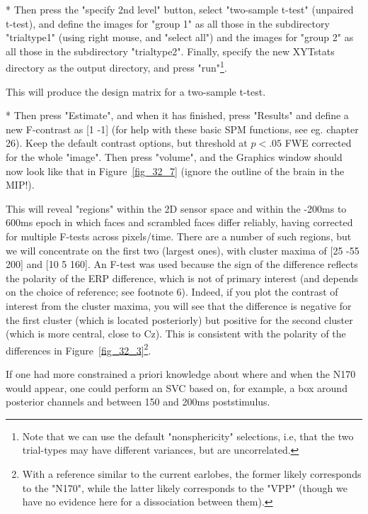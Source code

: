 * Then press the "specify 2nd level" button,  select "two-sample t-test" (unpaired t-test), and define the images for "group 1" as all those in the subdirectory "trialtype1" (using right mouse, and "select all") and the images for "group 2" as all those in the subdirectory "trialtype2". Finally, specify the new XYTstats directory as the output directory, and press "run"\footnote{Note that we can use the default "nonsphericity" selections, i.e, that the two trial-types may have different variances, but are uncorrelated.}.



This will produce the design matrix for a two-sample t-test.

* Then press "Estimate", and when it has finished, press "Results" and define a new F-contrast as [1 -1] (for help with these basic SPM functions, see eg. chapter 26). Keep the default contrast options, but threshold at $p<.05$ FWE corrected for the whole "image". Then press "volume", and the Graphics window should now look like that in Figure~\ref{fig_32_7} (ignore the outline of the brain in the MIP!).

This will reveal "regions" within the 2D sensor space and within the -200ms to 600ms epoch in which faces and scrambled faces differ reliably, having corrected for multiple F-tests across pixels/time. There are a number of such regions, but we will concentrate on the first two (largest ones), with cluster maxima of  [25 -55 200] and [10 5 160]. An F-test was used because the sign of the difference reflects the polarity of the ERP difference, which is not of primary interest (and depends on the choice of reference; see footnote 6). Indeed, if you plot the contrast of interest from the cluster maxima, you will see that the difference is negative for the first cluster (which is located posteriorly) but positive for the second cluster (which is more central, close to Cz). This is consistent with the polarity of the differences in Figure~\ref{fig_32_3}\footnote{With a reference similar to the current earlobes, the former likely corresponds to the "N170", while the latter likely corresponds to the "VPP" (though we have no evidence here for a dissociation between them).}.

If one had more constrained a priori knowledge about where and when the N170 would appear, one could perform an SVC based on, for example, a box around posterior channels and between 150 and 200ms poststimulus.

